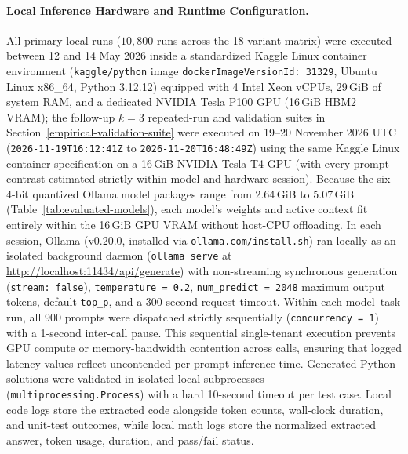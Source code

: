 \documentclass[a4paper,fleqn]{cas-sc}
\begin{document}
\paragraph{Local Inference Hardware and Runtime Configuration.}
All primary local runs ($10{,}800$ runs across the 18-variant matrix) were executed between 12 and 14 May 2026 inside a standardized Kaggle Linux container environment (\texttt{kaggle/python} image \texttt{dockerImageVersionId: 31329}, Ubuntu Linux x86\_64, Python 3.12.12) equipped with 4 Intel Xeon vCPUs, 29\,GiB of system RAM, and a dedicated NVIDIA Tesla P100 GPU (16\,GiB HBM2 VRAM); the follow-up $k = 3$ repeated-run and validation suites in Section~\ref{empirical-validation-suite} were executed on 19--20 November 2026 UTC (\texttt{2026-11-19T16:12:41Z} to \texttt{2026-11-20T16:48:49Z}) using the same Kaggle Linux container specification on a 16\,GiB NVIDIA Tesla T4 GPU (with every prompt contrast estimated strictly within model and hardware session). Because the six 4-bit quantized Ollama model packages range from 2.64\,GiB to 5.07\,GiB (Table~\ref{tab:evaluated-models}), each model's weights and active context fit entirely within the 16\,GiB GPU VRAM without host-CPU offloading. In each session, Ollama (v0.20.0, installed via \texttt{ollama.com/install.sh}) ran locally as an isolated background daemon (\texttt{ollama serve} at \url{http://localhost:11434/api/generate}) with non-streaming synchronous generation (\texttt{stream:\ false}), \texttt{temperature = 0.2}, \texttt{num\_predict = 2048} maximum output tokens, default \texttt{top\_p}, and a 300-second request timeout. Within each model--task run, all 900 prompts were dispatched strictly sequentially (\texttt{concurrency = 1}) with a 1-second inter-call pause. This sequential single-tenant execution prevents GPU compute or memory-bandwidth contention across calls, ensuring that logged latency values reflect uncontended per-prompt inference time. Generated Python solutions were validated in isolated local subprocesses (\texttt{multiprocessing.Process}) with a hard 10-second timeout per test case. Local code logs store the extracted code alongside token counts, wall-clock duration, and unit-test outcomes, while local math logs store the normalized extracted answer, token usage, duration, and pass/fail status.
\end{document}

